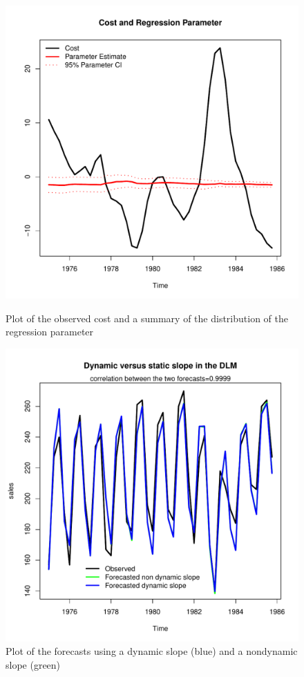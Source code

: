 \documentclass{article}
\begin{document}
\begin{enumerate}[(a)]
		\begin{figure}
			\begin{minipage}{0.45\linewidth}
				\centering
				\includegraphics[width=0.7\linewidth]{CostandRegressionParm}
				\caption{Plot of the observed cost and a summary of the distribution of the regression parameter}
				\label{fig:costandregressionparm}
			\end{minipage}
			\hfill
			\begin{minipage}{0.45\linewidth}
				\centering
				\includegraphics[width=0.7\linewidth]{DynVsStaticSlope}
				\caption{Plot of the forecasts using a dynamic slope (blue) and a nondynamic slope (green)}
				\label{fig:dynvsstatic}
			\end{minipage}
			
		\end{figure}
		

\end{enumerate}
\end{document}
